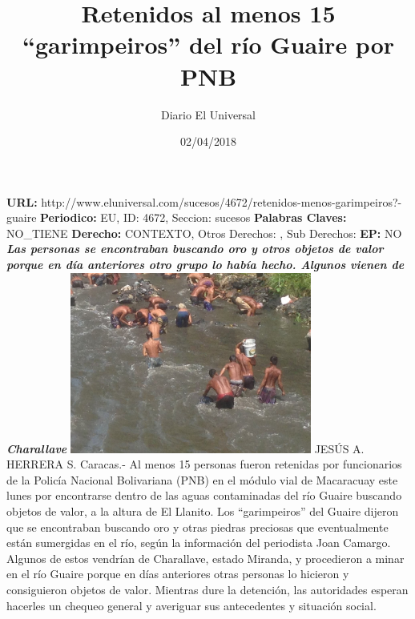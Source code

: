 \documentclass{article}%
\title{\textbf{Retenidos al menos 15 “garimpeiros” del río Guaire por PNB}}%
\author{Diario El Universal}%
\date{02/04/2018}%
\begin{document}
%
\normalsize%
\maketitle%
\textbf{URL: }%
http://www.eluniversal.com/sucesos/4672/retenidos{-}menos{-}garimpeiros?{-}guaire\newline%
%
\textbf{Periodico: }%
EU, %
ID: %
4672, %
Seccion: %
sucesos\newline%
%
\textbf{Palabras Claves: }%
NO\_TIENE\newline%
%
\textbf{Derecho: }%
CONTEXTO, %
Otros Derechos: %
, %
Sub Derechos: %
\newline%
%
\textbf{EP: }%
NO\newline%
\newline%
%
\textbf{\textit{Las personas se encontraban buscando oro y otros objetos de valor porque en día anteriores otro grupo lo había hecho. Algunos vienen de Charallave}}%
\newline%
\newline%
%
\includegraphics[width=300px]{20.jpg}%
\newline%
%
JESÚS A. HERRERA S.%
\newline%
%
Caracas.{-} Al menos 15 personas fueron retenidas por funcionarios de la Policía Nacional Bolivariana (PNB) en el módulo vial de Macaracuay este lunes por encontrarse dentro de las aguas contaminadas del río Guaire buscando objetos de valor, a la altura de El Llanito.%
\newline%
%
Los “garimpeiros” del Guaire dijeron que se encontraban buscando oro y otras piedras preciosas que eventualmente están sumergidas en el río, según la información del periodista Joan Camargo.%
\newline%
%
Algunos de estos vendrían de Charallave, estado Miranda, y procedieron a minar en el río Guaire porque en días anteriores otras personas lo hicieron y consiguieron objetos de valor.%
\newline%
%
Mientras dure la detención, las autoridades esperan hacerles un chequeo general y averiguar sus antecedentes y situación social.%
\newline%
%
\end{document}
